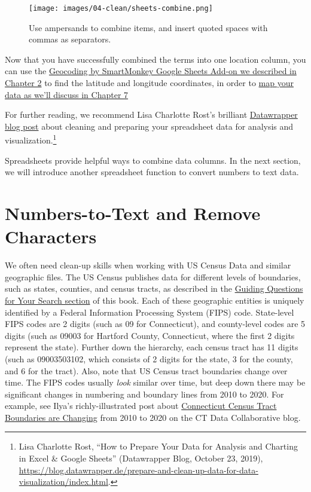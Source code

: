 \documentclass[
  english,
]{book}
\begin{document}
\begin{figure}
\centering
\texttt{[image: images/04-clean/sheets-combine.png]}
\caption{\label{fig:sheets-combine}Use ampersands to combine items, and insert quoted spaces with commas as separators.}
\end{figure}

Now that you have successfully combined the terms into one location column, you can use the \href{geocode.html}{Geocoding by SmartMonkey Google Sheets Add-on we described in Chapter 2} to find the latitude and longitude coordinates, in order to \href{map.html}{map your data as we'll discuss in Chapter 7}

For further reading, we recommend Lisa Charlotte Rost's brilliant \href{https://blog.datawrapper.de/prepare-and-clean-up-data-for-data-visualization/}{Datawrapper blog post}
about cleaning and preparing your spreadsheet data for analysis and visualization.\footnote{Lisa Charlotte Rost, {``How to {Prepare Your Data} for {Analysis} and {Charting} in {Excel} \& {Google Sheets}''} ({Datawrapper Blog}, October 23, 2019), \url{https://blog.datawrapper.de/prepare-and-clean-up-data-for-data-visualization/index.html}.}

Spreadsheets provide helpful ways to combine data columns. In the next section, we will introduce another spreadsheet function to convert numbers to text data.

\hypertarget{numbers-to-text}{%
\section*{Numbers-to-Text and Remove Characters}\label{numbers-to-text}}

We often need clean-up skills when working with US Census Data and similar geographic files. The US Census publishes data for different levels of boundaries, such as states, counties, and census tracts, as described in the \href{guiding.html}{Guiding Questions for Your Search section} of this book. Each of these geographic entities is uniquely identified by a Federal Information Processing System (FIPS) code. State-level FIPS codes are 2 digits (such as 09 for Connecticut), and county-level codes are 5 digits (such as 09003 for Hartford County, Connecticut, where the first 2 digits represent the state). Further down the hierarchy, each census tract has 11 digits (such as 09003503102, which consists of 2 digits for the state, 3 for the county, and 6 for the tract). Also, note that US Census tract boundaries change over time. The FIPS codes usually \emph{look} similar over time, but deep down there may be significant changes in numbering and boundary lines from 2010 to 2020. For example, see Ilya's richly-illustrated post about \href{https://www.ctdata.org/blog/2020-census-geography-connecticut}{Connecticut Census Tract Boundaries are Changing} from 2010 to 2020 on the CT Data Collaborative blog.
\end{document}
